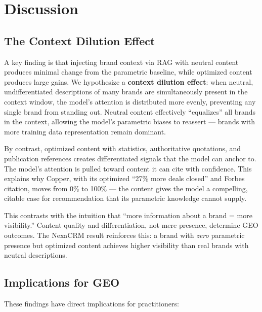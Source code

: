 \documentclass{article}
\begin{document}
\section{Discussion}

\subsection{The Context Dilution Effect}

A key finding is that injecting brand context via RAG with neutral content produces minimal change from the parametric baseline, while optimized content produces large gains. We hypothesize a \textbf{context dilution effect}: when neutral, undifferentiated descriptions of many brands are simultaneously present in the context window, the model's attention is distributed more evenly, preventing any single brand from standing out. Neutral content effectively ``equalizes'' all brands in the context, allowing the model's parametric biases to reassert — brands with more training data representation remain dominant.

By contrast, optimized content with statistics, authoritative quotations, and publication references creates differentiated signals that the model can anchor to. The model's attention is pulled toward content it can cite with confidence. This explains why Copper, with its optimized ``27\% more deals closed'' and Forbes citation, moves from 0\% to 100\% — the content gives the model a compelling, citable case for recommendation that its parametric knowledge cannot supply.

This contrasts with the intuition that ``more information about a brand = more visibility.'' Content quality and differentiation, not mere presence, determine GEO outcomes. The NexaCRM result reinforces this: a brand with \emph{zero} parametric presence but optimized content achieves higher visibility than real brands with neutral descriptions.

\subsection{Implications for GEO}

These findings have direct implications for practitioners:
\end{document}
